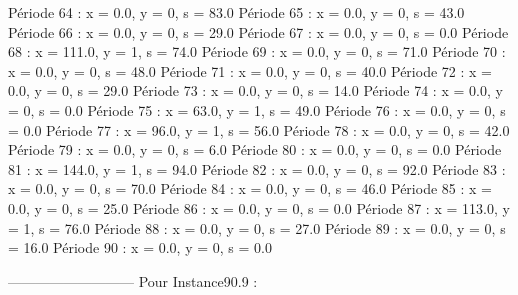 Période 64 : x = 0.0, y = 0, s = 83.0
Période 65 : x = 0.0, y = 0, s = 43.0
Période 66 : x = 0.0, y = 0, s = 29.0
Période 67 : x = 0.0, y = 0, s = 0.0
Période 68 : x = 111.0, y = 1, s = 74.0
Période 69 : x = 0.0, y = 0, s = 71.0
Période 70 : x = 0.0, y = 0, s = 48.0
Période 71 : x = 0.0, y = 0, s = 40.0
Période 72 : x = 0.0, y = 0, s = 29.0
Période 73 : x = 0.0, y = 0, s = 14.0
Période 74 : x = 0.0, y = 0, s = 0.0
Période 75 : x = 63.0, y = 1, s = 49.0
Période 76 : x = 0.0, y = 0, s = 0.0
Période 77 : x = 96.0, y = 1, s = 56.0
Période 78 : x = 0.0, y = 0, s = 42.0
Période 79 : x = 0.0, y = 0, s = 6.0
Période 80 : x = 0.0, y = 0, s = 0.0
Période 81 : x = 144.0, y = 1, s = 94.0
Période 82 : x = 0.0, y = 0, s = 92.0
Période 83 : x = 0.0, y = 0, s = 70.0
Période 84 : x = 0.0, y = 0, s = 46.0
Période 85 : x = 0.0, y = 0, s = 25.0
Période 86 : x = 0.0, y = 0, s = 0.0
Période 87 : x = 113.0, y = 1, s = 76.0
Période 88 : x = 0.0, y = 0, s = 27.0
Période 89 : x = 0.0, y = 0, s = 16.0
Période 90 : x = 0.0, y = 0, s = 0.0


---------------------------
Pour Instance90.9  :

